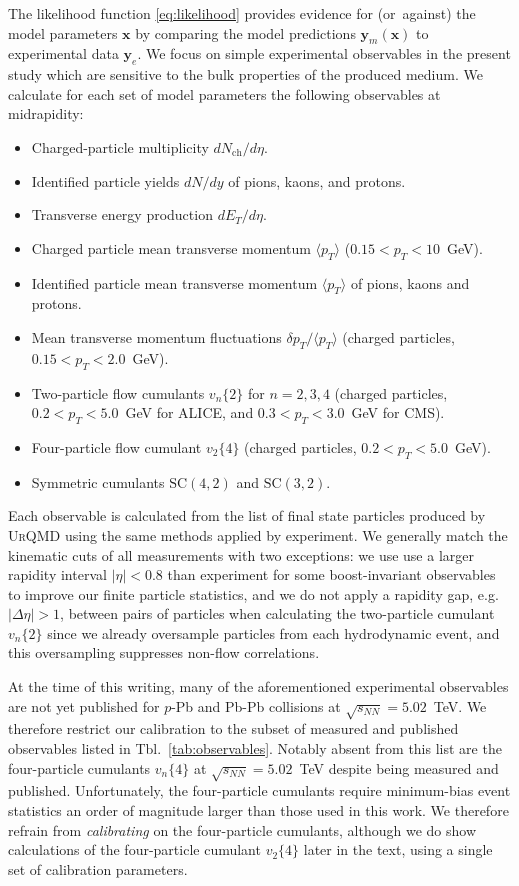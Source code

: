 \documentclass[aps,prc,reprint,amsmath,nofootinbib]{revtex4-1}
\newcommand{\sqrts}{\sqrt{s_{NN}}}
\newcommand{\nch}{N_\text{ch}}
\newcommand{\x}{\mathbf{x}}
\newcommand{\y}{\mathbf{y}}
\newcommand{\vnk}[2]{v_#1\{#2\}}
\def\\#1{ #1}
\begin{document}
The likelihood function \eqref{eq:likelihood} provides evidence for \mbox{(or against)} the model parameters $\x$ by comparing the model predictions $\y_m(\x)$ to experimental data $\y_e$.
We focus on simple experimental observables in the present study which are sensitive to the bulk properties of the produced medium.
We calculate for each set of model parameters the following observables at midrapidity:
\begin{itemize}[leftmargin=1\parindent, itemsep=0pt]
  \item Charged-particle multiplicity $d\nch/d\eta$.
  \item Identified particle yields $dN/dy$ of pions, kaons, and protons.
  \item Transverse energy production $dE_T/d\eta$.
  \item Charged particle mean transverse momentum $\langle p_T \rangle$ ($0.15 < p_T < 10$~GeV).
  \item Identified particle mean transverse momentum $\langle p_T \rangle$ of pions, kaons and protons.
  \item Mean transverse momentum fluctuations $\delta p_T / \langle p_T \rangle$ (charged particles, $0.15 < p_T < 2.0$~GeV).
  \item Two-particle flow cumulants $\vnk{n}{2}$ for $n=2,3,4$\\ (charged particles, $0.2 < p_T < 5.0$~GeV for ALICE, and $0.3 < p_T < 3.0$~GeV for CMS).
  \item Four-particle flow cumulant $\vnk{2}{4}$ \\(charged particles, $0.2 < p_T < 5.0$~GeV).
  \item Symmetric cumulants $\mathrm{SC}(4, 2)$ and $\mathrm{SC}(3,2)$.
\end{itemize}
Each observable is calculated from the list of final state particles produced by \textsc{UrQMD} using the same methods applied by experiment.
We generally match the kinematic cuts of all measurements with two exceptions: we use use a larger rapidity interval $|\eta| < 0.8$ than experiment for some boost-invariant observables to improve our finite particle statistics, and we do not apply a rapidity gap, e.g.\ $|\Delta \eta| > 1$, between pairs of particles when calculating the two-particle cumulant $\vnk{n}{2}$ since we already oversample particles from each hydrodynamic event, and this oversampling suppresses non-flow correlations.

At the time of this writing, many of the aforementioned experimental observables are not yet published for $p$-Pb and Pb-Pb collisions at $\sqrts=5.02$~TeV.
We therefore restrict our calibration to the subset of measured and published observables listed in Tbl.~\ref{tab:observables}.
Notably absent from this list are the four-particle cumulants $\vnk{n}{4}$ at $\sqrts=5.02$~TeV despite being measured and published.
Unfortunately, the four-particle cumulants require minimum-bias event statistics an order of magnitude larger than those used in this work.
We therefore refrain from \emph{calibrating} on the four-particle cumulants, although we do show calculations of the four-particle cumulant $\vnk{2}{4}$ later in the text, using a single set of calibration parameters.
\end{document}
